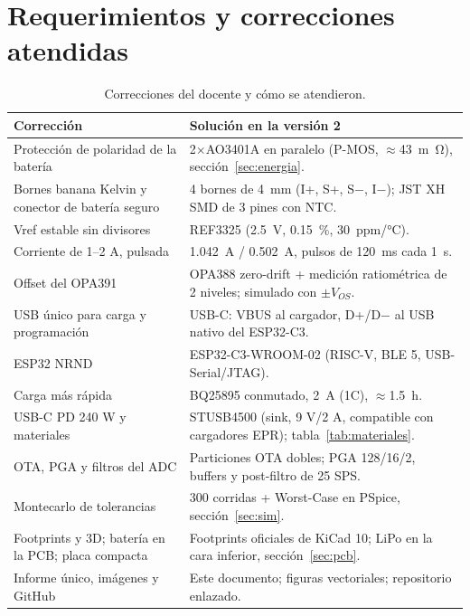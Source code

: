 \documentclass[11pt,a4paper]{article}
\begin{document}
\section{Requerimientos y correcciones atendidas}
\begin{table}[H]\centering\small
\caption{Correcciones del docente y cómo se atendieron.}\label{tab:correcciones}
\begin{tabularx}{\textwidth}{>{\RaggedRight}p{5.2cm}Y}
\toprule
\textbf{Corrección} & \textbf{Solución en la versión 2}\\\midrule
Protección de polaridad de la batería & 2$\times$AO3401A en paralelo (P-MOS, $\approx$\SI{43}{m\ohm}), sección~\ref{sec:energia}.\\
Bornes banana Kelvin y conector de batería seguro & 4 bornes de \SI{4}{mm} (I+, S+, S$-$, I$-$); JST XH SMD de 3 pines con NTC.\\
Vref estable sin divisores & REF3325 (\SI{2,5}{V}, \SI{0,15}{\percent}, \SI{30}{ppm/\celsius}).\\
Corriente de 1--2 A, pulsada & \SI{1,042}{A} / \SI{0,502}{A}, pulsos de \SI{120}{ms} cada \SI{1}{s}.\\
Offset del OPA391 & OPA388 zero-drift + medición ratiométrica de 2 niveles; simulado con $\pm V_{OS}$.\\
USB único para carga y programación & USB-C: VBUS al cargador, D+/D$-$ al USB nativo del ESP32-C3.\\
ESP32 NRND & ESP32-C3-WROOM-02 (RISC-V, BLE 5, USB-Serial/JTAG).\\
Carga más rápida & BQ25895 conmutado, \SI{2}{A} (1C), $\approx$\SI{1,5}{h}.\\
USB-C PD 240 W y materiales & STUSB4500 (sink, 9 V/2 A, compatible con cargadores EPR); tabla~\ref{tab:materiales}.\\
OTA, PGA y filtros del ADC & Particiones OTA dobles; PGA 128/16/2, buffers y post-filtro de 25 SPS.\\
Montecarlo de tolerancias & 300 corridas + Worst-Case en PSpice, sección~\ref{sec:sim}.\\
Footprints y 3D; batería en la PCB; placa compacta & Footprints oficiales de KiCad 10; LiPo en la cara inferior, sección~\ref{sec:pcb}.\\
Informe único, imágenes y GitHub & Este documento; figuras vectoriales; repositorio enlazado.\\
\bottomrule\end{tabularx}
\end{table}
\end{document}
